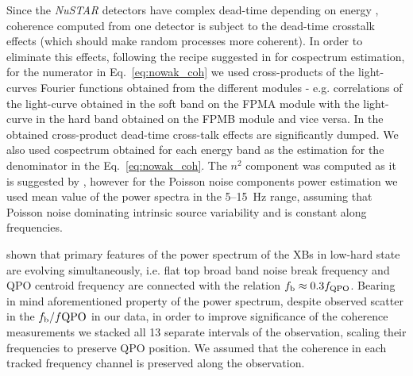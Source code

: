 \documentclass[a4paper,fleqn,usenatbib]{mnras}
\begin{document}
Since the {\it NuSTAR} detectors have complex dead-time depending on energy \citep[see ][for a details on how this affects power spectra]{2015ApJ...800..109B}, coherence computed from one detector is subject to the dead-time crosstalk effects (which should make random processes more coherent).
In order to eliminate this effects, following the recipe suggested in \cite{2015ApJ...800..109B} for cospectrum estimation, for the numerator in Eq.~\ref{eq:nowak_coh} we used cross-products of the light-curves Fourier functions obtained from the different modules - e.g. correlations of the light-curve obtained in the soft band on the FPMA module with the light-curve in the hard band obtained on the FPMB module and vice versa.
In the obtained cross-product dead-time cross-talk effects are significantly dumped.
We also used cospectrum obtained for each energy band as the estimation for the denominator in the Eq.~\ref{eq:nowak_coh}.
The $n^2$ component was computed as it is suggested by \citet{1997ApJ...474L..43V}, however for the Poisson noise components power estimation we used mean value of the power spectra in the 5--15~Hz range, assuming that Poisson noise dominating intrinsic source variability and is constant along frequencies. 

\citet{wijnands99} shown that primary features of the power spectrum of the XBs in low-hard state are evolving simultaneously, i.e. flat top broad band noise break frequency and QPO centroid frequency are connected with the relation $f_{\rm b} \approx 0.3 f_{\rm QPO}$.
Bearing in mind aforementioned property of the power spectrum, despite observed scatter in the $f_{\rm b}/f{\rm QPO}$ in our data, in order to improve significance of the coherence measurements we stacked all 13 separate intervals of the observation, scaling their frequencies to preserve QPO position. 
We assumed that the coherence in each tracked frequency channel is preserved along the observation. 
\end{document}
